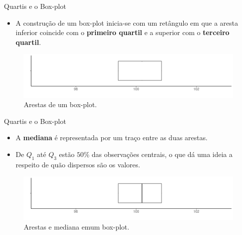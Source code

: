 \documentclass[
  ignorenonframetext,
  serif,
  professionalfont,
  usenames,
  dvipsnames,
  aspectratio = 169]{beamer}
\providecommand{\tightlist}{%
  \setlength{\itemsep}{0pt}\setlength{\parskip}{0pt}}
\renewcommand{\tightlist}{%
  \setlength{\itemsep}{0\baselineskip}
  \setlength{\parskip}{0.25\baselineskip}
}
\begin{document}
\begin{frame}{Quartis e o Box-plot}
\label{quartis-e-o-box-plot-2}
\begin{itemize}
\tightlist
\item
  A construção de um box-plot inicia-se com um retângulo em que a aresta
  inferior coincide com o \textbf{primeiro quartil} e a superior com o
  \textbf{terceiro quartil}.
\end{itemize}

\begin{figure}

{\centering \includegraphics[width=0.9\linewidth]{./img/boxplot1} 

}

\caption{Arestas de um box-plot.}\label{fig:unnamed-chunk-13}
\end{figure}
\end{frame}

\begin{frame}{Quartis e o Box-plot}
\label{quartis-e-o-box-plot-3}
\begin{itemize}
\item
  A \textbf{mediana} é representada por um traço entre as duas arestas.
\item
  De \(Q_1\) até \(Q_3\) estão \(50\%\) das observações centrais, o que
  dá uma ideia a respeito de quão dispersos são os valores.
\end{itemize}

\begin{figure}

{\centering \includegraphics[width=0.9\linewidth]{./img/boxplot2} 

}

\caption{Arestas e mediana emum box-plot.}\label{fig:unnamed-chunk-14}
\end{figure}
\end{frame}
\end{document}
